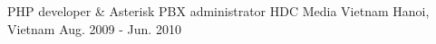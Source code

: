 \begin{cventries}
{%
}
\vspace{-3mm}	
\cventry
{PHP developer \& Asterisk PBX administrator} %
{HDC Media Vietnam} %
{Hanoi, Vietnam} %
{Aug. 2009 - Jun. 2010} %
{
}
\vspace{-5mm}	
\end{cventries}
